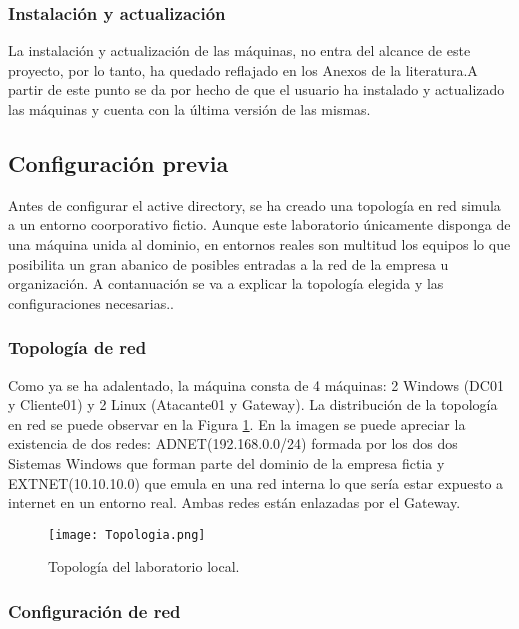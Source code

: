 \subsubsection{Instalación y actualización}

La instalación y actualización de las máquinas, no entra del alcance de este proyecto, por lo tanto, ha quedado reflajado en los Anexos de la literatura.A partir de este punto se da por hecho de que el usuario ha instalado y actualizado las máquinas y cuenta con la última versión de las mismas. 

\subsection{Configuración previa}

Antes de configurar el active directory, se ha creado una topología en red simula a un entorno coorporativo fictio. Aunque este laboratorio únicamente disponga de una máquina unida al dominio, en entornos reales son multitud los equipos lo que posibilita un gran abanico de posibles entradas a la red de la empresa u organización. A contanuación se va a explicar la topología elegida y las configuraciones necesarias.. 

\subsubsection{Topología de red}

Como ya se ha adalentado, la máquina consta de 4 máquinas: 2 Windows (DC01 y Cliente01) y 2 Linux (Atacante01 y Gateway). La distribución de la topología en red se puede observar en la Figura \ref{Topología}. En la imagen se puede apreciar la existencia de dos redes: ADNET(192.168.0.0/24) formada por los dos dos Sistemas Windows que forman parte del dominio de la empresa fictia y EXTNET(10.10.10.0) que emula en una red interna lo que sería estar expuesto a internet en un entorno real. Ambas redes están enlazadas por el Gateway. 

\begin{figure}[t!] %
\begin{center}
\texttt{[image: Topologia.png]}
\end{center}
\caption{Topología del laboratorio local.}
\label{Topología}
\end{figure}

\subsubsection{Configuración de red}

